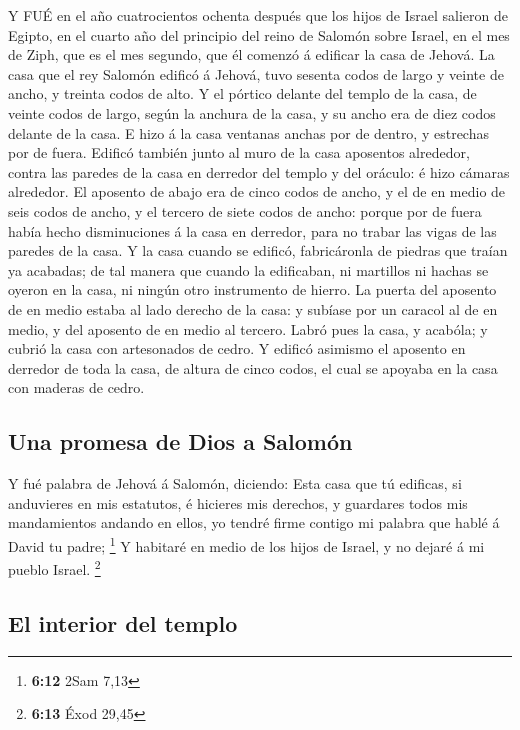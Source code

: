  Y FUÉ en el año cuatrocientos ochenta después que los hijos
de Israel salieron de Egipto, en el cuarto año del principio del reino
de Salomón sobre Israel, en el mes de Ziph, que es el mes segundo, que
él comenzó á edificar la casa de Jehová.  La casa que el rey
Salomón edificó á Jehová, tuvo sesenta codos de largo y veinte de ancho,
y treinta codos de alto.  Y el pórtico delante del templo de
la casa, de veinte codos de largo, según la anchura de la casa, y su
ancho era de diez codos delante de la casa.  E hizo á la
casa ventanas anchas por de dentro, y estrechas por de fuera.
 Edificó también junto al muro de la casa aposentos
alrededor, contra las paredes de la casa en derredor del templo y del
oráculo: é hizo cámaras alrededor.  El aposento de abajo era
de cinco codos de ancho, y el de en medio de seis codos de ancho, y el
tercero de siete codos de ancho: porque por de fuera había hecho
disminuciones á la casa en derredor, para no trabar las vigas de las
paredes de la casa.  Y la casa cuando se edificó,
fabricáronla de piedras que traían ya acabadas; de tal manera que cuando
la edificaban, ni martillos ni hachas se oyeron en la casa, ni ningún
otro instrumento de hierro.  La puerta del aposento de en
medio estaba al lado derecho de la casa: y subíase por un caracol al de
en medio, y del aposento de en medio al tercero.  Labró pues
la casa, y acabóla; y cubrió la casa con artesonados de cedro.
 Y edificó asimismo el aposento en derredor de toda la
casa, de altura de cinco codos, el cual se apoyaba en la casa con
maderas de cedro.

\hypertarget{una-promesa-de-dios-a-salomuxf3n}{%
\subsection{Una promesa de Dios a
Salomón}\label{una-promesa-de-dios-a-salomuxf3n}}

 Y fué palabra de Jehová á Salomón, diciendo: 
Esta casa que tú edificas, si anduvieres en mis estatutos, é hicieres
mis derechos, y guardares todos mis mandamientos andando en ellos, yo
tendré firme contigo mi palabra que hablé á David tu padre; \footnote{\textbf{6:12}
  2Sam 7,13}  Y habitaré en medio de los hijos de Israel, y
no dejaré á mi pueblo Israel. \footnote{\textbf{6:13} Éxod 29,45}

\hypertarget{el-interior-del-templo}{%
\subsection{El interior del templo}\label{el-interior-del-templo}}


